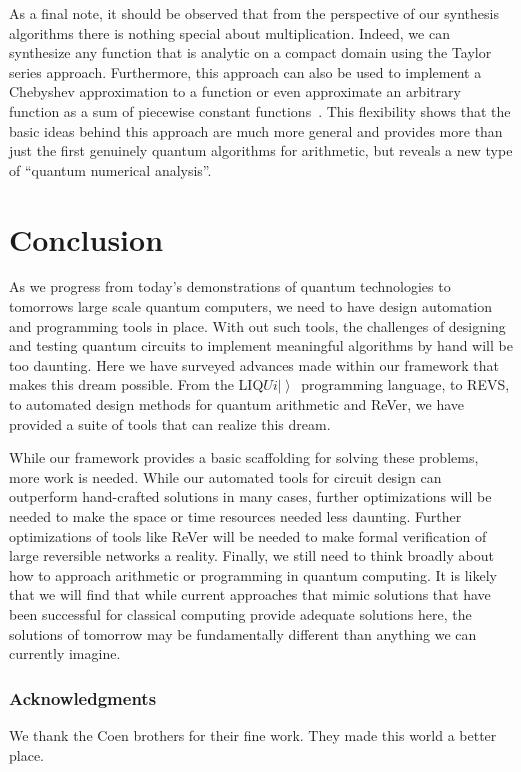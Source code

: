 \documentclass[conference]{IEEEtran}
\newcommand{\ket}[1]{\left| #1\right\rangle}        %
\newcommand{\Liquid}{LIQ$Ui\ket{}$\ }
\begin{document}
As a final note, it should be observed that from the perspective of our synthesis algorithms there is nothing special about multiplication.  Indeed, we can synthesize any function that is analytic on a compact domain using the Taylor series approach.  Furthermore, this approach can also be used to implement a Chebyshev approximation to a function or even approximate an arbitrary function as a sum of piecewise constant functions~\cite{WR16}.  This flexibility shows that the basic ideas behind this approach are much more general and provides more than just the first genuinely quantum algorithms for arithmetic, but reveals a new type of ``quantum numerical analysis''.

\section{Conclusion}
As we progress from today's demonstrations of quantum technologies to tomorrows large scale quantum computers, we need to have 
design automation and programming tools in place.  With out such tools, the challenges of designing and testing quantum circuits to implement meaningful
algorithms by hand will be too daunting.  Here we have surveyed advances made within our framework that makes this dream possible.
From the \Liquid programming language, to REVS, to automated design methods for quantum arithmetic and ReVer, we have provided a suite of tools
that can realize this dream.

While our framework provides a basic scaffolding for solving these problems, more work is needed.  While our automated tools for circuit design can outperform hand-crafted
solutions in many cases, further optimizations will be needed to make the space or time resources needed less daunting.  Further optimizations of tools like ReVer will
be needed to make formal verification of large reversible networks a reality.  Finally, we still need to think broadly about how to approach arithmetic or programming
in quantum computing.  It is likely that we will find that while current approaches that mimic solutions that have been successful for classical computing provide adequate solutions here,
the solutions of tomorrow may be fundamentally different than anything we can currently imagine.

\subsubsection*{Acknowledgments} We thank the Coen brothers for their fine work. They made this world a better place. 



\end{document}
